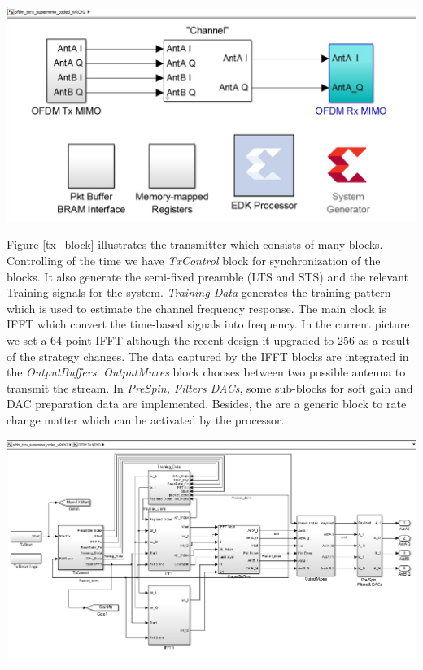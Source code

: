 \begin{center}
\includegraphics[width=\textwidth]{content/fig/system.JPG}
\label{ofdm_system}
\end{center}

Figure \ref{tx_block} illustrates the transmitter which consists of many blocks. Controlling of the time we have \textit{TxControl} block for synchronization of the blocks. It also generate the semi-fixed preamble (LTS and STS) and the relevant Training signals for the system. \textit{Training Data} generates the training pattern which is used to estimate the channel frequency response.
The main clock is IFFT which convert the time-based signals into frequency. In the current picture we set a 64 point IFFT although the recent design it upgraded to 256 as a result of the strategy changes. The data captured by the IFFT blocks are integrated in the \textit{OutputBuffers}. \textit{OutputMuxes} block chooses between two possible antenna to transmit the stream. In \textit{PreSpin, Filters DACs}, some sub-blocks for soft gain and DAC preparation data are implemented. Besides, the are a generic block to rate change matter which can be activated by the processor.\\

\begin{center}
\includegraphics[width=\textwidth]{content/fig/txblock.JPG}
\label{tx_block}
\end{center}


